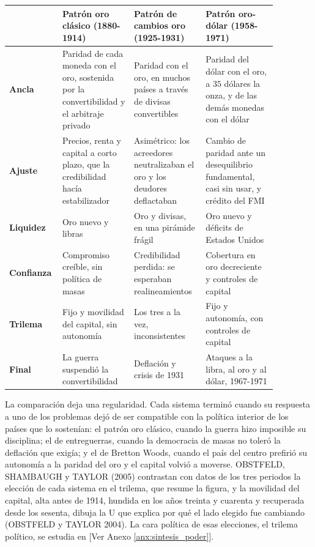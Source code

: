 \documentclass[10pt,a4paper]{article}
\newcommand{\authorfont}[1]{{\fontfamily{EBGaramond-TLF}\selectfont #1}}
\begin{document}
\begin{center}
{\footnotesize
\begin{tabular}{|p{0.12\linewidth}|p{0.25\linewidth}|p{0.25\linewidth}|p{0.25\linewidth}|}
\hline
 & \textbf{Patrón oro clásico (1880-1914)} & \textbf{Patrón de cambios oro (1925-1931)} & \textbf{Patrón oro-dólar (1958-1971)} \\
\hline
\textbf{Ancla} & Paridad de cada moneda con el oro, sostenida por la convertibilidad y el arbitraje privado & Paridad con el oro, en muchos países a través de divisas convertibles & Paridad del dólar con el oro, a $35$ dólares la onza, y de las demás monedas con el dólar \\
\hline
\textbf{Ajuste} & Precios, renta y capital a corto plazo, que la credibilidad hacía estabilizador & Asimétrico: los acreedores neutralizaban el oro y los deudores deflactaban & Cambio de paridad ante un desequilibrio fundamental, casi sin usar, y crédito del FMI \\
\hline
\textbf{Liquidez} & Oro nuevo y libras & Oro y divisas, en una pirámide frágil & Oro nuevo y déficits de Estados Unidos \\
\hline
\textbf{Confianza} & Compromiso creíble, sin política de masas & Credibilidad perdida: se esperaban realineamientos & Cobertura en oro decreciente y controles de capital \\
\hline
\textbf{Trilema} & Fijo y movilidad del capital, sin autonomía & Los tres a la vez, inconsistentes & Fijo y autonomía, con controles de capital \\
\hline
\textbf{Final} & La guerra suspendió la convertibilidad & Deflación y crisis de 1931 & Ataques a la libra, al oro y al dólar, 1967-1971 \\
\hline
\end{tabular}}
\end{center}

La comparación deja una regularidad. Cada sistema terminó cuando su respuesta a uno de los problemas dejó de ser compatible con la política interior de los países que lo sostenían: el patrón oro clásico, cuando la guerra hizo imposible su disciplina; el de entreguerras, cuando la democracia de masas no toleró la deflación que exigía; y el de Bretton Woods, cuando el país del centro prefirió su autonomía a la paridad del oro y el capital volvió a moverse. OBSTFELD, SHAMBAUGH y TAYLOR (2005) contrastan con datos de los tres periodos la elección de cada sistema en el trilema, que resume la figura, y la movilidad del capital, alta antes de 1914, hundida en los años treinta y cuarenta y recuperada desde los sesenta, dibuja la U que explica por qué el lado elegido fue cambiando (OBSTFELD y TAYLOR 2004). La cara política de esas elecciones, el trilema político, se estudia en [\authorfont{Ver Anexo \ref{anx:sintesis_poder}}].
\end{document}

